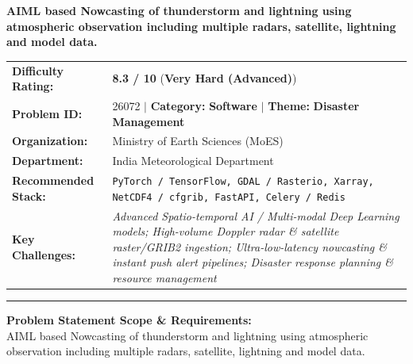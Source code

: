 \documentclass[10pt,a4paper]{article}
\begin{document}
\begin{tcolorbox}[pscard, title={"\textbf{SIH26072} \quad $\vert$ \quad AIML based Nowcasting of thunderstorm and lightning using atmospheric obser...}]
\textbf{\large AIML based Nowcasting of thunderstorm and lightning using atmospheric observation including multiple radars, satellite, lightning and model data.}\\[0.25cm]

\begin{tabular}{@{}lp{12.5cm}@{}}
\textbf{Difficulty Rating:} & \textcolor{diffveryhard}{\textbf{\Large 8.3 / 10}} \quad (\textbf{Very Hard (Advanced)}) \\
\textbf{Problem ID:} & 26072 \quad $\vert$ \quad \textbf{Category:} \textbf{Software} \quad $\vert$ \quad \textbf{Theme:} \textbf{Disaster Management} \\
\textbf{Organization:} & Ministry of Earth Sciences (MoES) \\
\textbf{Department:} & India Meteorological Department \\
\textbf{Recommended Stack:} & \texttt{PyTorch / TensorFlow, GDAL / Rasterio, Xarray, NetCDF4 / cfgrib, FastAPI, Celery / Redis} \\
\textbf{Key Challenges:} & \textit{\small Advanced Spatio-temporal AI / Multi-modal Deep Learning models; High-volume Doppler radar \& satellite raster/GRIB2 ingestion; Ultra-low-latency nowcasting \& instant push alert pipelines; Disaster response planning \& resource management} \\
\end{tabular}

\vspace{0.2cm}
\hrule
\vspace{0.2cm}

\textbf{\color{sihnavy}Problem Statement Scope \& Requirements:}\\[0.15cm]
\noindent\small AIML based Nowcasting of thunderstorm and lightning using atmospheric observation including multiple radars, satellite, lightning and model data.\par\vspace{0.06cm}

\end{tcolorbox}
\vspace{0.4cm}
{}
\end{document}
